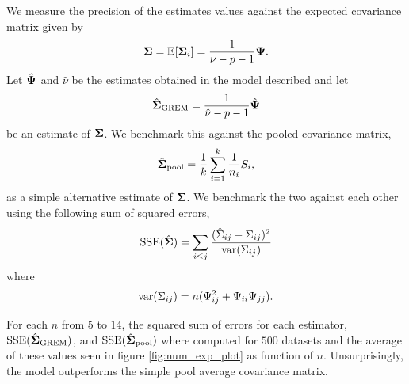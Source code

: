 \documentclass{article}\usepackage[]{graphicx}\usepackage[]{color}
\begin{document}
We measure the precision of the estimates values against the expected covariance matrix given by
\begin{align*}
  {\boldsymbol{\Sigma}} = \mathbb{E}[{\boldsymbol{\Sigma}}_i] = \frac{1}{\nu - p - 1}{\boldsymbol{\Psi}}.
\end{align*}
Let ${\hat{\boldsymbol{\Psi}}}$ and $\hat{\nu}$ be the estimates obtained in the model described and let
\begin{align*}
  \hat{{\boldsymbol{\Sigma}}}_\text{GREM} = \frac{1}{\hat{\nu} - p - 1}{\hat{\boldsymbol{\Psi}}}
\end{align*}
be an estimate of ${\boldsymbol{\Sigma}}$. We benchmark this against the pooled covariance matrix,
\begin{align*}
  {\hat{\boldsymbol{\Sigma}}}_\text{pool}
    = \frac{1}{k} \sum_{i = 1}^k \frac{1}{n_i} S_i,
\end{align*}
as a simple alternative estimate of ${\boldsymbol{\Sigma}}$.
We benchmark the two against each other using the following sum of squared errors,
\begin{align*}
  \text{SSE}({\hat{\boldsymbol{\Sigma}}}) = \sum_{i \leq j} \frac{(\hat{\Sigma}_{ij}- \Sigma_{ij})^2}{\text{var}(\Sigma_{ij})}
\end{align*}
where
\begin{align*}
 \text{var}(\Sigma_{ij}) = n(\Psi_{ij}^2 + \Psi_{ii}\Psi_{jj}).
\end{align*}

For each $n$ from $5$ to $14$, the squared sum of errors for each estimator, $\text{SSE}({\hat{\boldsymbol{\Sigma}}}_\text{GREM})$, and $\text{SSE}({\hat{\boldsymbol{\Sigma}}}_\text{pool})$ where computed for $500$ datasets and the average of these values seen in figure \ref{fig:num_exp_plot} as function of $n$.
Unsurprisingly, the model outperforms the simple pool average covariance matrix.
\end{document}
